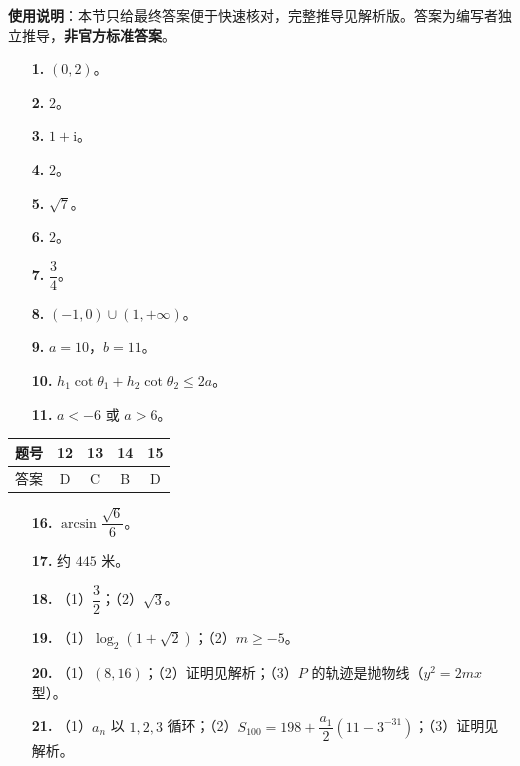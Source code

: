 
\begin{gknotice}
\textbf{使用说明}：本节只给最终答案便于快速核对，完整推导见解析版。答案为编写者独立推导，\textbf{非官方标准答案}。
\end{gknotice}

\begin{itemize}[leftmargin=2.6em]
  \item[\textbf{1.}] $(0,2)$。
  \item[\textbf{2.}] $2$。
  \item[\textbf{3.}] $1+\mathrm i$。
  \item[\textbf{4.}] $2$。
  \item[\textbf{5.}] $\sqrt7$。
  \item[\textbf{6.}] $2$。
  \item[\textbf{7.}] $\dfrac34$。
  \item[\textbf{8.}] $(-1,0)\cup(1,+\infty)$。
  \item[\textbf{9.}] $a=10$，$b=11$。
  \item[\textbf{10.}] $h_1\cot\theta_1+h_2\cot\theta_2\leqslant2a$。
  \item[\textbf{11.}] $a<-6$ 或 $a>6$。
\end{itemize}

\begin{center}\begin{tabular}{ccccc}
\toprule
题号 & 12 & 13 & 14 & 15 \\
\midrule
答案 & D & C & B & D \\
\bottomrule
\end{tabular}\end{center}

\begin{itemize}[leftmargin=2.6em]
  \item[\textbf{16.}] $\arcsin\dfrac{\sqrt6}6$。
  \item[\textbf{17.}] 约 $445$ 米。
  \item[\textbf{18.}] （1）$\dfrac32$；（2）$\sqrt3$。
  \item[\textbf{19.}] （1）$\log_2(1+\sqrt2)$；（2）$m\geqslant-5$。
  \item[\textbf{20.}] （1）$(8,16)$；（2）证明见解析；（3）$P$ 的轨迹是抛物线（$y^2=2mx$ 型）。
  \item[\textbf{21.}] （1）$a_n$ 以 $1,2,3$ 循环；（2）$S_{100}=198+\dfrac{a_1}2\left(11-3^{-31}\right)$；（3）证明见解析。
\end{itemize}
